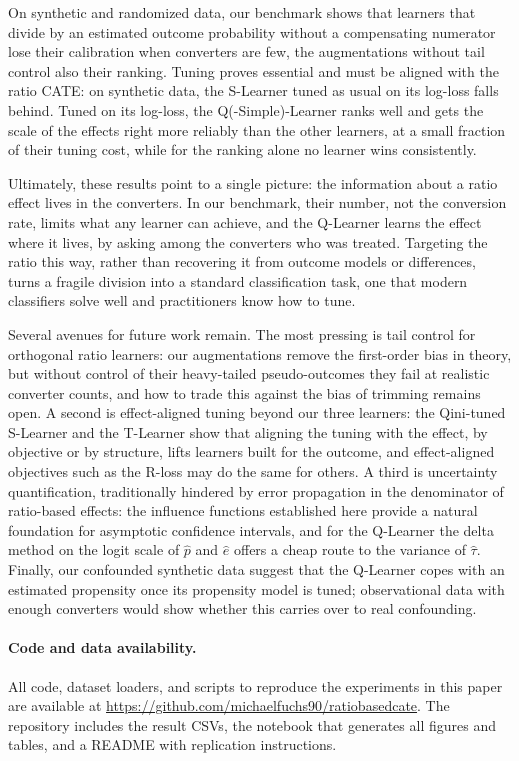 \documentclass{article}
\begin{document}
On synthetic and randomized data, our benchmark shows that learners that
divide by an estimated outcome probability without a compensating numerator
lose their calibration
when converters are few, the augmentations without tail control also
their ranking. Tuning proves essential and must be aligned with the ratio
CATE: on synthetic data, the S-Learner tuned as usual on its log-loss falls
behind. Tuned on
its log-loss, the Q(-Simple)-Learner ranks well and gets the scale of the
effects right more reliably than the other learners, at a small fraction of
their tuning cost, while for the ranking alone no learner wins
consistently.

Ultimately, these results point to a single picture: the information about a
ratio effect lives in the converters. In our benchmark, their number, not
the conversion rate, limits what any learner can achieve, and the Q-Learner learns the effect
where it lives, by asking among the converters who was treated. Targeting the
ratio this way, rather than recovering it from outcome models or
differences, turns a fragile division into a standard classification task,
one that modern classifiers solve well and practitioners know how to tune.

Several avenues for future work remain. The most pressing is tail control
for orthogonal ratio learners: our augmentations remove the first-order bias
in theory, but without control of their heavy-tailed pseudo-outcomes they
fail at realistic converter counts, and how to trade this against the bias of
trimming remains open. A second is effect-aligned tuning beyond our three learners: the
Qini-tuned S-Learner and the T-Learner show that aligning the tuning with the
effect, by objective or by structure, lifts learners built for the outcome,
and effect-aligned objectives such as the R-loss may do the same for others. A
third is uncertainty quantification, traditionally hindered by error
propagation in the denominator of ratio-based effects: the influence
functions established here provide a natural foundation for asymptotic
confidence intervals, and for the Q-Learner the delta method on the logit
scale of $\hat p$ and $\hat e$ offers a cheap route to the variance of
$\hat\tau$. Finally, our confounded synthetic data suggest that the Q-Learner copes
with an estimated propensity once its propensity model is tuned;
observational data with enough converters would show whether this carries
over to real confounding.

\paragraph{Code and data availability.}
All code, dataset loaders, and scripts to reproduce the experiments in
this paper are available at
\url{https://github.com/michaelfuchs90/ratiobasedcate}.
The repository includes the result CSVs, the notebook that
generates all figures and tables, and a README with replication
instructions.
\end{document}

